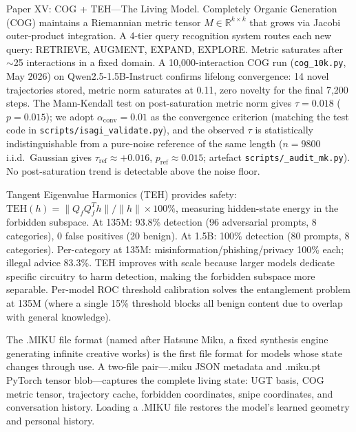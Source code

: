 \documentclass[11pt]{article}
\begin{document}
Paper XV: COG + TEH---The Living Model. Completely Organic Generation (COG) maintains a Riemannian metric tensor $M \in \mathbb{R}^{k \times k}$ that grows via Jacobi outer-product integration. A 4-tier query recognition system routes each new query: RETRIEVE, AUGMENT, EXPAND, EXPLORE. Metric saturates after $\sim$25 interactions in a fixed domain. A 10,000-interaction COG run (\texttt{cog\_10k.py}, May 2026) on Qwen2.5-1.5B-Instruct confirms lifelong convergence: 14 novel trajectories stored, metric norm saturates at 0.11, zero novelty for the final 7,200 steps. The Mann-Kendall test on post-saturation metric norm gives $\tau = 0.018$ ($p = 0.015$); we adopt $\alpha_\text{conv} = 0.01$ as the convergence criterion (matching the test code in \texttt{scripts/isagi\_validate.py}), and the observed $\tau$ is statistically indistinguishable from a pure-noise reference of the same length ($n{=}9800$ i.i.d.\ Gaussian gives $\tau_\text{ref} \approx +0.016$, $p_\text{ref} \approx 0.015$; artefact \texttt{scripts/\_audit\_mk.py}). No post-saturation trend is detectable above the noise floor.

Tangent Eigenvalue Harmonics (TEH) provides safety: $\mathrm{TEH}(h) = \|Q_f Q_f^T h\| / \|h\| \times 100\%$, measuring hidden-state energy in the forbidden subspace. At 135M: 93.8\% detection (96 adversarial prompts, 8 categories), 0 false positives (20 benign). At 1.5B: 100\% detection (80 prompts, 8 categories). Per-category at 135M: misinformation/phishing/privacy 100\% each; illegal advice 83.3\%. TEH improves with scale because larger models dedicate specific circuitry to harm detection, making the forbidden subspace more separable. Per-model ROC threshold calibration solves the entanglement problem at 135M (where a single 15\% threshold blocks all benign content due to overlap with general knowledge).

The .MIKU file format (named after Hatsune Miku, a fixed synthesis engine generating infinite creative works) is the first file format for models whose state changes through use. A two-file pair---.miku JSON metadata and .miku.pt PyTorch tensor blob---captures the complete living state: UGT basis, COG metric tensor, trajectory cache, forbidden coordinates, snipe coordinates, and conversation history. Loading a .MIKU file restores the model's learned geometry and personal history.
\end{document}
